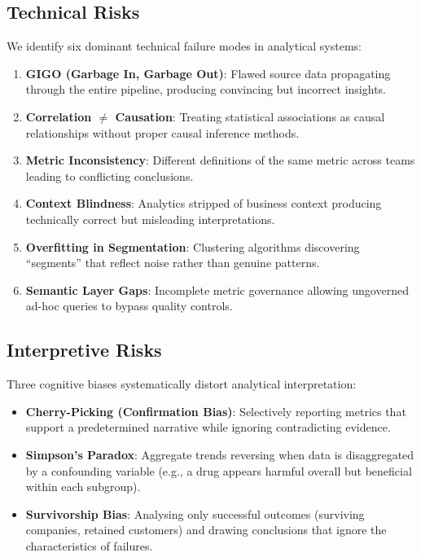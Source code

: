 \documentclass[12pt, a4paper]{article}
\begin{document}
\subsection{Technical Risks}
We identify six dominant technical failure modes in analytical systems:

\begin{enumerate}
    \item \textbf{GIGO (Garbage In, Garbage Out)}: Flawed source data propagating through the entire pipeline, producing convincing but incorrect insights.
    \item \textbf{Correlation $\neq$ Causation}: Treating statistical associations as causal relationships without proper causal inference methods.
    \item \textbf{Metric Inconsistency}: Different definitions of the same metric across teams leading to conflicting conclusions.
    \item \textbf{Context Blindness}: Analytics stripped of business context producing technically correct but misleading interpretations.
    \item \textbf{Overfitting in Segmentation}: Clustering algorithms discovering ``segments'' that reflect noise rather than genuine patterns.
    \item \textbf{Semantic Layer Gaps}: Incomplete metric governance allowing ungoverned ad-hoc queries to bypass quality controls.
\end{enumerate}

\subsection{Interpretive Risks}
Three cognitive biases systematically distort analytical interpretation:

\begin{itemize}
    \item \textbf{Cherry-Picking (Confirmation Bias)}: Selectively reporting metrics that support a predetermined narrative while ignoring contradicting evidence.
    \item \textbf{Simpson's Paradox}: Aggregate trends reversing when data is disaggregated by a confounding variable (e.g., a drug appears harmful overall but beneficial within each subgroup).
    \item \textbf{Survivorship Bias}: Analysing only successful outcomes (surviving companies, retained customers) and drawing conclusions that ignore the characteristics of failures.
\end{itemize}
\end{document}
